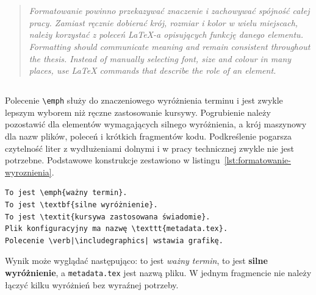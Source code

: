 \chapter{}
\label{app:formatowanie}

\begin{quote}\itshape
  \ploren
  {Formatowanie powinno przekazywać znaczenie i zachowywać spójność całej pracy. Zamiast ręcznie dobierać krój, rozmiar i kolor w wielu miejscach, należy korzystać z poleceń LaTeX-a opisujących funkcję danego elementu.}
  {Formatting should communicate meaning and remain consistent throughout the thesis. Instead of manually selecting font, size and colour in many places, use LaTeX commands that describe the role of an element.}
\end{quote}

\section{}

Polecenie \verb|\emph| służy do znaczeniowego wyróżnienia terminu i jest zwykle lepszym wyborem niż ręczne zastosowanie kursywy. Pogrubienie należy pozostawić dla elementów wymagających silnego wyróżnienia, a krój maszynowy dla nazw plików, poleceń i krótkich fragmentów kodu. Podkreślenie pogarsza czytelność liter z wydłużeniami dolnymi i w pracy technicznej zwykle nie jest potrzebne. Podstawowe konstrukcje zestawiono w listingu~\ref{lst:formatowanie-wyroznienia}.

\begin{lstlisting}[style=thesis,caption={Podstawowe sposoby wyróżniania tekstu},label={lst:formatowanie-wyroznienia}]
To jest \emph{ważny termin}.
To jest \textbf{silne wyróżnienie}.
To jest \textit{kursywa zastosowana świadomie}.
Plik konfiguracyjny ma nazwę \texttt{metadata.tex}.
Polecenie \verb|\includegraphics| wstawia grafikę.
\end{lstlisting}

Wynik może wyglądać następująco: to jest \emph{ważny termin}, to jest \textbf{silne wyróżnienie}, a \texttt{metadata.tex} jest nazwą pliku. W jednym fragmencie nie należy łączyć kilku wyróżnień bez wyraźnej potrzeby.

\section{}

